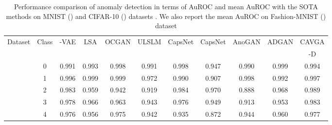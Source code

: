 \documentclass[runningheads]{llncs}
\begin{document}
\begin{table}[t!]
\begin{center}
\caption{
Performance comparison of anomaly detection in terms of AuROC and mean AuROC with the SOTA methods on MNIST () and CIFAR-10 () datasets . We also report the mean AuROC on Fashion-MNIST () dataset 
}
\label{table_novelty_detection}
\scriptsize
\begin{tabular}{ccccccccccc}
\toprule
		 Dataset &Class & -VAE &LSA  &OCGAN  &ULSLM  &CapsNet  &CapsNet  &AnoGAN & ADGAN   &CAVGA \\
		  & &\cite{dehaene2020iterative} & \cite{abati2019latent} & \cite{perera2019ocgan} & \cite{wolf2020unsupervised} & \cite{li2019exploring} & \cite{li2019exploring} & \cite{schlegl2017unsupervised} &  \cite{deecke2018image} & -D\\
\midrule
            	            &0 &\cellcolor{blue!40}0.991 &\cellcolor{blue!50}0.993 &\cellcolor{blue!70}0.998 &\cellcolor{blue!40}0.991    &\cellcolor{blue!70}0.998     &\cellcolor{blue!20}0.947      &\cellcolor{blue!30}0.990    &\cellcolor{blue!80}\color{white}0.999    &\cellcolor{blue!60}0.994\\
            	            
            	            &1  &\cellcolor{blue!40}0.996 &\cellcolor{blue!80}\color{white}0.999 &\cellcolor{blue!80}\color{white}0.999  &\cellcolor{blue!15}0.972   &\cellcolor{blue!20}0.990     &\cellcolor{blue!10}0.907      &\cellcolor{blue!60}0.998    &\cellcolor{blue!30}0.992     &\cellcolor{blue!50}0.997\\
            	            
            	            &2 &\cellcolor{blue!60}0.983 &\cellcolor{blue!30}0.959 &\cellcolor{blue!15}0.942  &\cellcolor{blue!10}0.919     &\cellcolor{blue!70}0.984     &\cellcolor{blue!50}0.970      &\cellcolor{blue!5}0.888    &\cellcolor{blue!40}0.968                &\cellcolor{blue!80}\color{white}0.989\\
            	            
            	            &3  &\cellcolor{blue!70}0.978 &\cellcolor{blue!50}0.966  &\cellcolor{blue!40}0.963  &\cellcolor{blue!15}0.943  &\cellcolor{blue!60}0.976     &\cellcolor{blue!25}0.949      &\cellcolor{blue!5}0.913    &\cellcolor{blue!30}0.953        &\cellcolor{blue!80}\color{white}0.983\\
            	            
            	            &4  &\cellcolor{blue!70}0.976 &\cellcolor{blue!40}0.956 &\cellcolor{blue!60}0.975   &\cellcolor{blue!20}0.942  &\cellcolor{blue!15}0.935     &\cellcolor{blue!5}0.872      &\cellcolor{blue!30}0.944    &\cellcolor{blue!50}0.960        &\cellcolor{blue!80}\color{white}0.977\\
            	            

\end{tabular}
\end{center}
\end{table}
\end{document}
